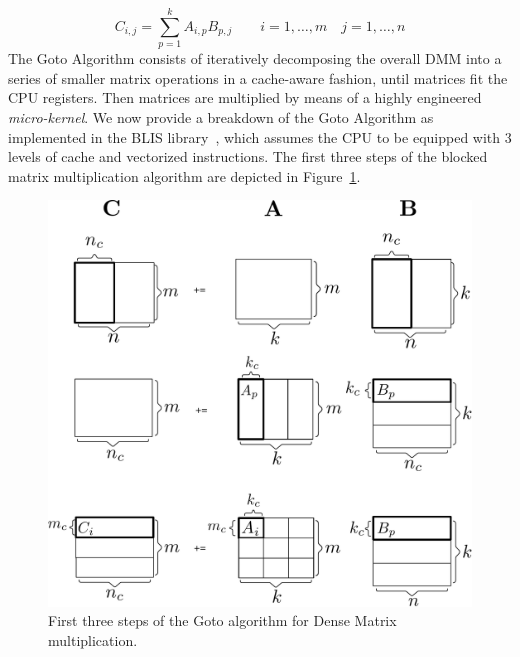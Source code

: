 \begin{equation} \label{eq:mmdef} 
C_{i,j} = \sum_{p=1}^{k} A_{i, p}  B_{p,j} \qquad  i=1, \dots, m \quad j=1, \dots, n 
\end{equation}
The Goto Algorithm consists of iteratively decomposing the overall DMM into a series of smaller matrix operations in a cache-aware fashion, until matrices fit the CPU registers. Then matrices are multiplied by means of a highly engineered \textit{micro-kernel}. We now provide a breakdown of the Goto Algorithm as implemented in the BLIS library~\cite{lawson1979basic,van2015blis}, which assumes the CPU to be equipped with 3 levels of cache and vectorized instructions. The first three steps of the blocked matrix multiplication algorithm are depicted in Figure~\ref{fig:gotofirst}.

\begin{figure}[htb]
	\centering
	\includegraphics[width=\columnwidth]{imgs/Goto_first.pdf}
	\caption{First three steps of the Goto algorithm for Dense Matrix multiplication.}
		\label{fig:gotofirst}
\end{figure}

